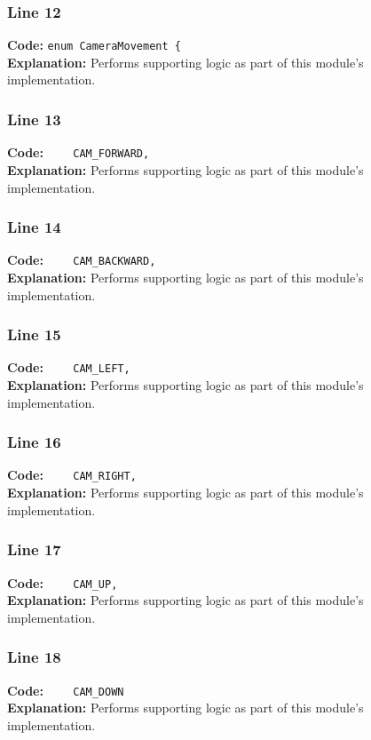 \documentclass[11pt,a4paper]{article}
\begin{document}
\subsubsection*{Line 12}
\textbf{Code:} \verb|enum CameraMovement {|\\
\textbf{Explanation:} Performs supporting logic as part of this module's implementation.

\subsubsection*{Line 13}
\textbf{Code:} \verb|    CAM_FORWARD,|\\
\textbf{Explanation:} Performs supporting logic as part of this module's implementation.

\subsubsection*{Line 14}
\textbf{Code:} \verb|    CAM_BACKWARD,|\\
\textbf{Explanation:} Performs supporting logic as part of this module's implementation.

\subsubsection*{Line 15}
\textbf{Code:} \verb|    CAM_LEFT,|\\
\textbf{Explanation:} Performs supporting logic as part of this module's implementation.

\subsubsection*{Line 16}
\textbf{Code:} \verb|    CAM_RIGHT,|\\
\textbf{Explanation:} Performs supporting logic as part of this module's implementation.

\subsubsection*{Line 17}
\textbf{Code:} \verb|    CAM_UP,|\\
\textbf{Explanation:} Performs supporting logic as part of this module's implementation.

\subsubsection*{Line 18}
\textbf{Code:} \verb|    CAM_DOWN|\\
\textbf{Explanation:} Performs supporting logic as part of this module's implementation.
\end{document}
